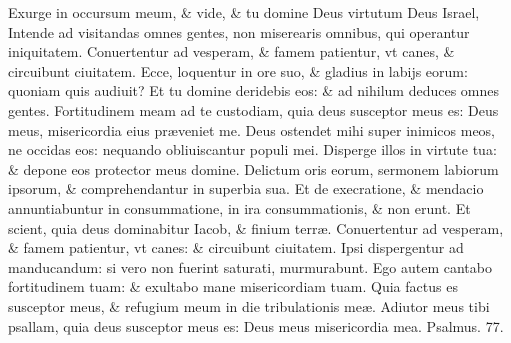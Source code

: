 \documentclass[a5paper,10pt]{book}
\def\ae{æ}
\begin{document}
\begin{multicols*}{2}
\newline \color{red} E\color{black}xurge in occursum meum, \& vide, \& tu domine Deus virtutum Deus Israel,
\newline \color{red} I\color{black}ntende ad visitandas omnes gentes, non miserearis omnibus, qui operantur iniquitatem.
\newline \color{red} C\color{black}onuertentur ad vesperam, \& famem patientur, vt canes, \& circuibunt ciuitatem.
\newline \color{red} E\color{black}cce, loquentur in ore suo, \& gladius in labijs eorum: quoniam quis audiuit?
\newline \color{red} E\color{black}t tu domine deridebis eos: \& ad nihilum deduces omnes gentes.%
\newline \color{red} F\color{black}ortitudinem meam ad te custodiam, quia deus susceptor meus es: Deus meus, misericordia eius pr\ae veniet me.
\newline \color{red} D\color{black}eus ostendet mihi super inimicos meos, ne occidas eos: nequando obliuiscantur populi mei.
\newline \color{red} D\color{black}isperge illos in virtute tua: \& depone eos protector meus domine.
\newline \color{red} D\color{black}elictum oris eorum, sermonem labiorum ipsorum, \& comprehendantur in superbia sua.
\newline \color{red} E\color{black}t de execratione, \& mendacio annuntiabuntur in consummatione, in ira consummationis, \& non erunt.
\newline \color{red} E\color{black}t scient, quia deus dominabitur Iacob, \& finium terr\ae .
\newline \color{red} C\color{black}onuertentur ad vesperam, \& famem patientur, vt canes: \& circuibunt ciuitatem.
\newline \color{red} I\color{black}psi dispergentur ad manducandum: si vero non fuerint saturati, murmurabunt.%
\newline \color{red} E\color{black}go autem cantabo fortitudinem tuam: \& exultabo mane misericordiam tuam.
\newline \color{red} Q\color{black}uia factus es susceptor meus, \& refugium meum in die tribulationis me\ae .
\newline \color{red} A\color{black}diutor meus tibi psallam, quia deus susceptor meus es: Deus meus misericordia mea. \quad \color{red} Psalmus. \hypertarget{ps77}{77.} \color{black}
\vspace{-.5em}

\end{multicols*}
\end{document}
